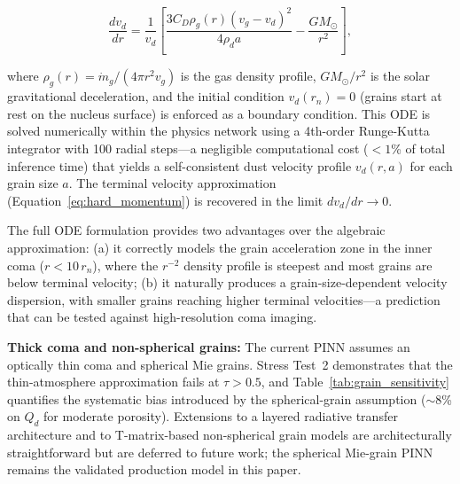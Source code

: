 \documentclass[usenatbib]{mnras}
\begin{document}
\begin{equation}\label{eq:dust_gas_ode}
\frac{d v_d}{d r} = \frac{1}{v_d}\left[\frac{3 C_D \rho_g(r) (v_g - v_d)^2}{4 \rho_d a} - \frac{G M_{\odot}}{r^2}\right],
\end{equation}

where $\rho_g(r) = \dot{m}_g / (4\pi r^2 v_g)$ is the gas density profile, $G M_{\odot}/r^2$ is the solar gravitational deceleration, and the initial condition $v_d(r_n) = 0$ (grains start at rest on the nucleus surface) is enforced as a boundary condition. This ODE is solved numerically within the physics network using a 4th-order Runge-Kutta integrator with 100 radial steps---a negligible computational cost ($<1$\% of total inference time) that yields a self-consistent dust velocity profile $v_d(r, a)$ for each grain size $a$. The terminal velocity approximation (Equation~\ref{eq:hard_momentum}) is recovered in the limit $d v_d / d r \rightarrow 0$.

The full ODE formulation provides two advantages over the algebraic approximation: (a) it correctly models the grain acceleration zone in the inner coma ($r < 10\,r_n$), where the $r^{-2}$ density profile is steepest and most grains are below terminal velocity; (b) it naturally produces a grain-size-dependent velocity dispersion, with smaller grains reaching higher terminal velocities---a prediction that can be tested against high-resolution coma imaging.

\textbf{Thick coma and non-spherical grains:} The current PINN assumes an optically thin coma and spherical Mie grains. Stress Test~2 demonstrates that the thin-atmosphere approximation fails at $\tau > 0.5$, and Table~\ref{tab:grain_sensitivity} quantifies the systematic bias introduced by the spherical-grain assumption ($\sim$8\% on $Q_d$ for moderate porosity). Extensions to a layered radiative transfer architecture and to T-matrix-based non-spherical grain models are architecturally straightforward but are deferred to future work; the spherical Mie-grain PINN remains the validated production model in this paper.
\end{document}
